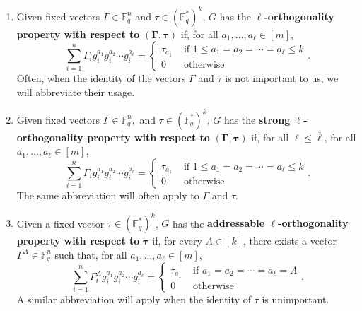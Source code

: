 \documentclass[11pt]{article}
\theoremstyle{definition}
\renewcommand{\le}{\leqslant}
\newcommand{\FF}{\mathbb{F}}
\newcommand*{\ol}{\overline}
\begin{document}
\begin{enumerate}[(1)]
    \item Given fixed vectors $\Gamma \in \mathbb{F}_q^n$ and $\tau \in (\mathbb{F}_q^*)^k$, $G$ has the \textbf{$\ell$-orthogonality property with respect to} $\boldsymbol{(\Gamma,\tau)}$ if, for all $a_1, \ldots, a_\ell \in [m]$, 
    \begin{equation}~\label{eq:ortho_prop}
        \sum_{i=1}^n \Gamma_i{g}^{a_1}_i {g}^{a_2}_i\cdots  {g}^{a_\ell}_i = 
        \begin{cases}
            \tau_{a_1} &\text{ if $1\le a_1 = a_2 = \cdots = a_\ell \le k$} \\
            0 &\text{ otherwise}
        \end{cases}.
    \end{equation}
    Often, when the identity of the vectors $\Gamma$ and $\tau$ is not important to us, we will abbreviate their usage.

    \item Given fixed vectors $\Gamma \in \mathbb{F}_q^n,$ and $\tau \in (\mathbb{F}_q^*)^k$, $G$ has the \textbf{strong $\ol\ell$-orthogonality property with respect to }$\boldsymbol{(\Gamma,\tau)}$ if, for all $\ell \le \ol\ell$, for all $a_1, \ldots, a_\ell \in [m]$,
    \begin{equation}~\label{eq:strong_ortho_prop}
        \sum_{i=1}^n \Gamma_i {g}^{a_1}_i {g}^{a_2}_i\cdots  {g}^{a_{\ell}}_i = 
        \begin{cases}
            \tau_{a_1} &\text{ if $1\le a_1 = a_2 = \cdots = a_{\ell} \le k$} \\
            0 &\text{ otherwise}
        \end{cases}.
    \end{equation}
    The same abbreviation will often apply to $\Gamma$ and $\tau$.
    
    \item Given a fixed vector $\tau \in (\mathbb{F}_q^*)^k$, $G$ has the \textbf{addressable $\ell$-orthogonality property with respect to }$\boldsymbol{\tau}$ if, for every $A\in [k]$, there exists a vector $\Gamma^A\in \FF_q^n$ such that, for all $a_1, \ldots, a_\ell \in [m]$,
    \begin{equation}~\label{eq:address_ortho_prop}
        \sum_{i=1}^n \Gamma^A_{i}{g}^{a_1}_i {g}^{a_2}_i\cdots  {g}^{a_\ell}_i = 
        \begin{cases}
            \tau_{a_1} &\text{ if $a_1 = a_2 = \cdots = a_\ell = A$} \\
            0 &\text{ otherwise}
        \end{cases}.
    \end{equation}
    A similar abbreviation will apply when the identity of $\tau$ is unimportant.


\end{enumerate}
\end{document}
